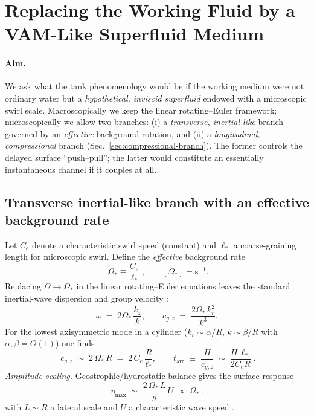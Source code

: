 \documentclass[12pt]{article}
\begin{document}
\section{Replacing the Working Fluid by a VAM-Like Superfluid Medium}
\label{sec:aether-medium}

\paragraph{Aim.}
We ask what the tank phenomenology would be if the working medium were not ordinary water but a \emph{hypothetical, inviscid superfluid} endowed with a microscopic swirl scale. Macroscopically we keep the linear rotating–Euler framework; microscopically we allow two branches: (i) a \emph{transverse, inertial-like} branch governed by an \emph{effective} background rotation, and (ii) a \emph{longitudinal, compressional} branch (Sec.~\ref{sec:compressional-branch}). The former controls the delayed surface ``push--pull''; the latter would constitute an essentially instantaneous channel if it couples at all.

\subsection{Transverse inertial-like branch with an effective background rate}
\label{sec:aether-transverse}
Let $C_e$ denote a characteristic swirl speed (constant) and $\ell_*$ a coarse-graining length for microscopic swirl. Define the \emph{effective} background rate
\begin{equation}
\boxed{\;\Omega_* \equiv \frac{C_e}{\ell_*}\;,}
\qquad [\Omega_*]=\mathrm{s^{-1}}.
\end{equation}
Replacing $\Omega\to\Omega_*$ in the linear rotating–Euler equations leaves the standard inertial-wave dispersion and group velocity \cite{Greenspan1968,Batchelor1967,Vallis2017}:
\begin{equation}
\omega \;=\; 2\Omega_*\,\frac{k_z}{k},
\qquad
c_{g,z} \;=\; \frac{2\Omega_*\,k_r^2}{k^3}.
\label{eq:disp-aether}
\end{equation}
For the lowest axisymmetric mode in a cylinder ($k_r\!\sim\!\alpha/R$, $k\!\sim\!\beta/R$ with $\alpha,\beta=O(1)$) one finds
\begin{equation}
\boxed{\;
c_{g,z}\;\sim\;2\,\Omega_*\,R
\;=\; 2\,C_e\,\frac{R}{\ell_*},
\qquad
t_{\mathrm{arr}}\;\equiv\;\frac{H}{c_{g,z}}\;\sim\;\frac{H\,\ell_*}{2 C_e R}\;.
}
\label{eq:arrive-aether}
\end{equation}
\emph{Amplitude scaling.} Geostrophic/hydrostatic balance gives the surface response
\begin{equation}
\boxed{\;\eta_{\max}\;\sim\;\frac{2\,\Omega_*\,L}{g}\,U\;\propto\;\Omega_*\;,}
\label{eq:eta-aether}
\end{equation}
with $L\!\sim\!R$ a lateral scale and $U$ a characteristic wave speed \cite{Batchelor1967,Vallis2017}.
\end{document}
